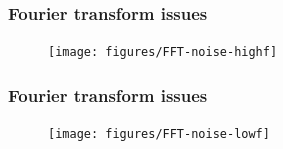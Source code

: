 \documentclass{beamer}
\begin{document}
\begin{frame}
    \frametitle{Fourier transform issues}
    
    \begin{figure}[ht]
    \centering
    \texttt{[image: figures/FFT-noise-highf]}
    \label{fig:fft-noise-highf}
    \end{figure}
\end{frame}

\begin{frame}
    \frametitle{Fourier transform issues}
    
    \begin{figure}[ht]
    \centering
    \texttt{[image: figures/FFT-noise-lowf]}
    \label{fig:fft-noise-lowf}
    \end{figure}
\end{frame}



    


\end{document}
